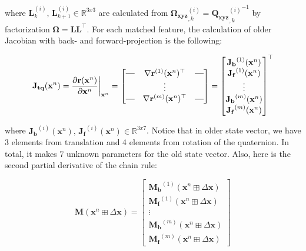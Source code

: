 \documentclass[a4paper]{report}
\numberwithin{figure}{section}
\newcommand{\R}{\mathbb{R}}
\newcommand*{\horzbar}{\rule[.5ex]{2.5ex}{0.5pt}}
\begin{document}
\begin{appendices}
where $\mathbf{L}^{(i)}_{k} \text{, } \mathbf{L}^{(i)}_{k+1} \in \R^{3x3}$ are 
calculated from 
$\mathbf{\Omega_{xyz}}^{(i)}_{,k}  =  {\mathbf{Q_{xyz}}^{(i)}_{,k}}^{-1}$ 
by factorization $\mathbf{\Omega = LL^\top}$.
For each matched feature, 
the calculation of older Jacobian with back- and forward-projection is the following:

\begin{equation}
  \mathbf{J_{tq}}(\mathbf{x}^n) = \frac{\partial 
  \mathbf{r}(\mathbf{x}^n)}{\partial \mathbf{x}^n } \bigg|_{\mathbf{x}^n}
  = 
  \begin{bmatrix}
    \horzbar & \nabla \mathbf{r}^{(1)}(\mathbf{x}^n)^\top & \horzbar \\
     & \vdots & \\
     \horzbar & \nabla \mathbf{r}^{(m)}(\mathbf{x}^n)^\top & \horzbar 
  \end{bmatrix}
  =
  \begin{bmatrix}
    \mathbf{J_b}^{(1)}(\mathbf{x}^n) \\
    \mathbf{J_f}^{(1)}(\mathbf{x}^n) \\
    \vdots \\
    \mathbf{J_b}^{(m)}(\mathbf{x}^n) \\
    \mathbf{J_f}^{(m)}(\mathbf{x}^n)
  \end{bmatrix}^\top
\end{equation}

where $\mathbf{J_b}^{(i)}(\mathbf{x}^n) \text{, } 
\mathbf{J_f}^{(i)}(\mathbf{x}^n) \in \R^{3x7}$. Notice that in older state 
vector, we have 3 elements from translation and 4 elements from rotation of the 
quaternion. In total, it makes 7 unknown parameters for the old state vector. 
Also, here is the second partial derivative of the chain rule:

\begin{equation}
  \mathbf{M} (\mathbf{x}^n\boxplus \Delta \mathbf{x})
  =
  \begin{bmatrix}
    \mathbf{M_b}^{(1)}(\mathbf{x}^n\boxplus \Delta \mathbf{x}) \\
    \mathbf{M_f}^{(1)}(\mathbf{x}^n\boxplus \Delta \mathbf{x}) \\
    \vdots \\
    \mathbf{M_b}^{(m)}(\mathbf{x}^n\boxplus \Delta \mathbf{x}) \\
    \mathbf{M_f}^{(m)}(\mathbf{x}^n\boxplus \Delta \mathbf{x})
  \end{bmatrix}
\end{equation}


\end{appendices}
\end{document}
